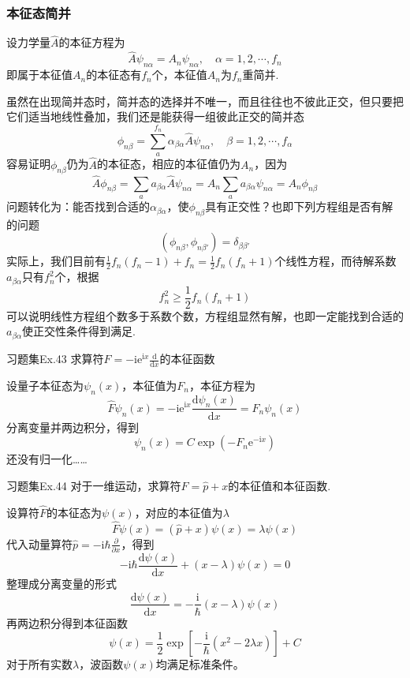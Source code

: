 \subsubsection{本征态简并}

设力学量$\hat{A}$的本征方程为
$$
    \hat{A}\psi_{n\alpha}=A_n\psi_{n\alpha}, \quad \alpha =1, 2, \cdots, f_n
$$
即属于本征值$A_n$的本征态有$f_n$个，本征值$A_n$为$f_n$重简并.

虽然在出现简并态时，简并态的选择并不唯一，而且往往也不彼此正交，但只要把它们适当地线性叠加，我们还是能获得一组彼此正交的简并态
$$
    \phi_{n\beta} = \sum_{a}^{f_n} \alpha_{\beta\alpha}\hat{A}\psi_{n\alpha}, \quad \beta = 1, 2, \cdots, f_{\alpha}
$$
容易证明$\phi_{n\beta}$仍为$\hat{A}$的本征态，相应的本征值仍为$A_n$，因为
$$
    \hat{A}\phi_{n\beta}
    = \sum_{a}a_{\beta\alpha}\hat{A}\psi_{n\alpha}
    = A_n\sum_{a}a_{\beta\alpha}\psi_{n\alpha}
    = A_n\phi_{n\beta}
$$
问题转化为：能否找到合适的$\alpha_{\beta\alpha}$，使$\phi_{n\beta}$具有正交性？也即下列方程组是否有解的问题
$$
    \left(\phi_{n\beta}, \phi_{n\beta'}\right)=\delta_{\beta\beta'}
$$
实际上，我们目前有$\frac{1}{2}f_n(f_n-1)+f_n=\frac{1}{2}f_n(f_n+1)$个线性方程，而待解系数$a_{\beta\alpha}$只有$f_n^2$个，根据
$$
    f_n^2 \geqslant \frac{1}{2}f_n(f_n+1)
$$
可以说明线性方程组个数多于系数个数，方程组显然有解，也即一定能找到合适的$a_{\beta\alpha}$使正交性条件得到满足.

\begin{question}{习题集Ex.43}
    求算符$\displaystyle \hat{F}=-\mathrm{ie}^{\mathrm{i}x}\frac{\mathrm{d}}{\mathrm{d}x}$的本征函数
\end{question}
\begin{solution}
    设量子本征态为$\psi_n(x)$，本征值为$F_n$，本征方程为
    $$
        \hat{F}\psi_n(x) = -\mathrm{ie}^{\mathrm{i}x}\frac{\mathrm{d}\psi_n(x)}{\mathrm{d}x} = F_n\psi_n(x)
    $$
    分离变量并两边积分，得到
    $$
        \psi_n(x)=C\exp\left(-F_n\mathrm{e}^{-\mathrm{i}x}\right)
    $$
    还没有归一化……
\end{solution}



\begin{question}{习题集Ex.44}
    对于一维运动，求算符$\hat{F}=\hat{p}+x$的本征值和本征函数.
\end{question}
\begin{solution}
    设算符$\hat{F}$的本征态为$\psi(x)$，对应的本征值为$\lambda$
    $$
        \hat{F}\psi(x) = (\hat{p}+x)\psi(x) = \lambda\psi(x)
    $$
    代入动量算符$\hat{p}=-\mathrm{i}\hbar\frac{\partial}{\partial x}$，得到
    $$
        -\mathrm{i}\hbar\frac{\mathrm{d}\psi(x)}{\mathrm{d}x}+(x-\lambda)\psi(x)=0
    $$
    整理成分离变量的形式
    $$
        \frac{\mathrm{d}\psi(x)}{\mathrm{d}x}=-\frac{\mathrm{i}}{\hbar}(x-\lambda)\psi(x)
    $$
    再两边积分得到本征函数
    $$
        \psi(x)=\frac{1}{2}\exp\left[-\frac{\mathrm{i}}{\hbar}(x^2-2\lambda x)\right]+C
    $$
    对于所有实数$\lambda$，波函数$\psi(x)$均满足标准条件。
\end{solution}



